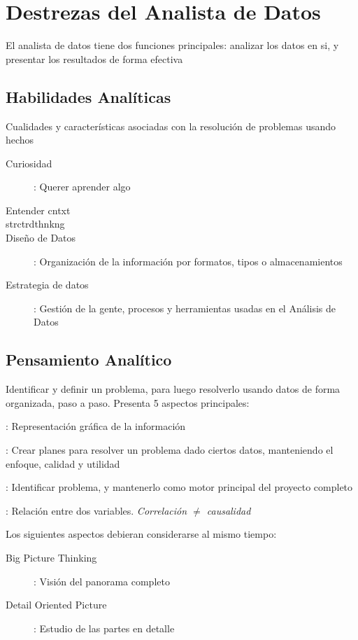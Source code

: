 
\section{Destrezas del Analista de Datos}
El analista de datos tiene dos funciones principales: analizar los datos en si, y presentar los resultados de forma efectiva

\subsection{Habilidades Analíticas}
Cualidades y características asociadas con la resolución de problemas usando hechos
\begin{description}
    \item[Curiosidad]: Querer aprender algo
    \item[Entender \gls{cntxt}]
    \item[\gls{strctrdthnkng}]
    \item[Diseño de Datos]: Organización de la información por formatos, tipos o almacenamientos
    \item[Estrategia de datos]: Gestión de la gente, procesos y herramientas usadas en el Análisis de Datos
\end{description}

\subsection{Pensamiento Analítico}
Identificar y definir un problema, para luego resolverlo usando datos de forma organizada, paso a paso. Presenta 5 aspectos principales:
\begin{description}
    \item[Visualización]: Representación gráfica de la información
    \item[Ser Estratégico]: Crear planes para resolver un problema dado ciertos datos, manteniendo el enfoque, calidad y utilidad
    \item[Pensamiento Orientado a Problemas]: Identificar problema, y mantenerlo como motor principal del proyecto completo
    \item[Correlación]: Relación entre dos variables. \textit{Correlación ${\neq}$ causalidad}
    \item{Los siguientes aspectos debieran considerarse al mismo tiempo:
    \begin{description}
        \item[Big Picture Thinking]: Visión del panorama completo
        \item[Detail Oriented Picture]: Estudio de las partes en detalle
    \end{description}}
\end{description}

